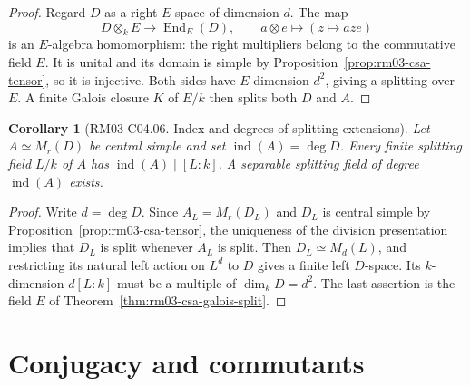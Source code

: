 \documentclass[11pt,oneside,openany]{book}
\newtheorem{corollary}[theorem]{Corollary}
\theoremstyle{definition}
\theoremstyle{remark}
\begin{document}
\begin{proof}
Regard \(D\) as a right \(E\)-space of dimension \(d\). The map
\[
 D\otimes_k E\longrightarrow \operatorname{End}_E(D),\qquad
 a\otimes e\longmapsto (z\mapsto aze)
\]
is an \(E\)-algebra homomorphism: the right multipliers belong to
the commutative field \(E\). It is unital and its domain is simple
by Proposition~\ref{prop:rm03-csa-tensor}, so it is injective.
Both sides have \(E\)-dimension \(d^2\), giving a splitting over
\(E\). A finite Galois closure \(K\) of \(E/k\) then splits both \(D\)
and \(A\).
\end{proof}

\begin{corollary}[RM03-C04.06. Index and degrees of splitting extensions]
\label{cor:rm03-csa-index}
Let \(A\simeq M_r(D)\) be central simple and set
\(\operatorname{ind}(A)=\deg D\). Every finite splitting field
\(L/k\) of \(A\) has \(\operatorname{ind}(A)\mid [L:k]\).
A separable splitting field of degree \(\operatorname{ind}(A)\)
exists.
\end{corollary}
\begin{proof}
Write \(d=\deg D\). Since \(A_L=M_r(D_L)\) and \(D_L\) is central
simple by Proposition~\ref{prop:rm03-csa-tensor}, the uniqueness
of the division presentation implies that \(D_L\) is split
whenever \(A_L\) is split. Then \(D_L\simeq M_d(L)\), and
restricting its natural left action on \(L^d\) to \(D\) gives a
finite left \(D\)-space. Its \(k\)-dimension \(d[L:k]\) must be a
multiple of \(\dim_k D=d^2\). The last assertion is the field \(E\)
of Theorem~\ref{thm:rm03-csa-galois-split}.
\end{proof}

\section{Conjugacy and commutants}
\end{document}

